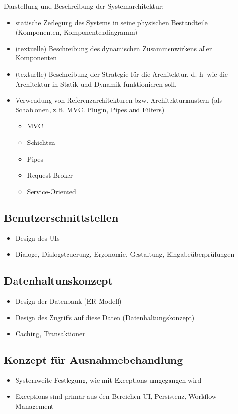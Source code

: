 Darstellung und Beschreibung der Systemarchitektur;

\begin{itemize}
	\item  statische Zerlegung des Systems in seine physischen Bestandteile (Komponenten, Komponentendiagramm)
	\item (textuelle) Beschreibung des dynamischen Zusammenwirkens aller Komponenten 
	\item (textuelle) Beschreibung der Strategie für die Architektur, d. h. wie die Architektur in Statik und Dynamik funktionieren soll.
	\item Verwendung von Referenzarchitekturen bzw. Architekturmustern (als Schablonen, z.B. MVC. Plugin, Pipes and Filters)
	\begin{itemize}
		\item MVC
		\item Schichten
		\item Pipes
		\item Request Broker
		\item Service-Oriented
	\end{itemize}
\end{itemize}

\subsection{Benutzerschnittstellen} 
\begin{itemize}
	\item Design des UIs
	\item Dialoge, Dialogsteuerung, Ergonomie, Gestaltung, Eingabeüberprüfungen
\end{itemize}

\subsection{Datenhaltunskonzept}
\begin{itemize}
	\item Design der Datenbank (ER-Modell)
	\item Design des Zugriffs auf diese Daten (Datenhaltungskonzept)
	\item Caching, Transaktionen
\end{itemize}

\subsection{Konzept für Ausnahmebehandlung}
\begin{itemize}
	\item Systemweite Festlegung, wie mit Exceptions umgegangen wird
	\item Exceptions sind primär aus den Bereichen UI, Persistenz, Workflow-Management
\end{itemize}

